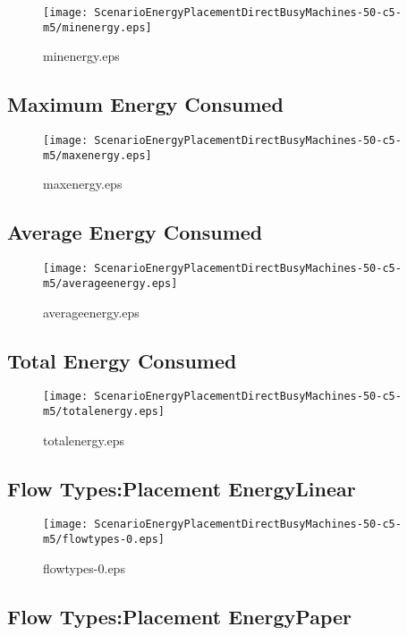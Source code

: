 \documentclass{elsart}
\begin{document}
\begin{figure}[ht]
\centering
\texttt{[image: ScenarioEnergyPlacementDirectBusyMachines-50-c5-m5/minenergy.eps]}
\caption{minenergy.eps}\label{fig:minenergy}
\end{figure}

\clearpage
\subsection{Maximum Energy Consumed}

\begin{figure}[ht]
\centering
\texttt{[image: ScenarioEnergyPlacementDirectBusyMachines-50-c5-m5/maxenergy.eps]}
\caption{maxenergy.eps}\label{fig:maxenergy}
\end{figure}

\clearpage
\subsection{Average Energy Consumed}

\begin{figure}[ht]
\centering
\texttt{[image: ScenarioEnergyPlacementDirectBusyMachines-50-c5-m5/averageenergy.eps]}
\caption{averageenergy.eps}\label{fig:averageenergy}
\end{figure}

\clearpage
\subsection{Total Energy Consumed}

\begin{figure}[ht]
\centering
\texttt{[image: ScenarioEnergyPlacementDirectBusyMachines-50-c5-m5/totalenergy.eps]}
\caption{totalenergy.eps}\label{fig:totalenergy}
\end{figure}

\clearpage
\subsection{Flow Types:Placement EnergyLinear}

\begin{figure}[ht]
\centering
\texttt{[image: ScenarioEnergyPlacementDirectBusyMachines-50-c5-m5/flowtypes-0.eps]}
\caption{flowtypes-0.eps}\label{fig:flowtypes-0}
\end{figure}

\clearpage
\subsection{Flow Types:Placement EnergyPaper}
\end{document}
